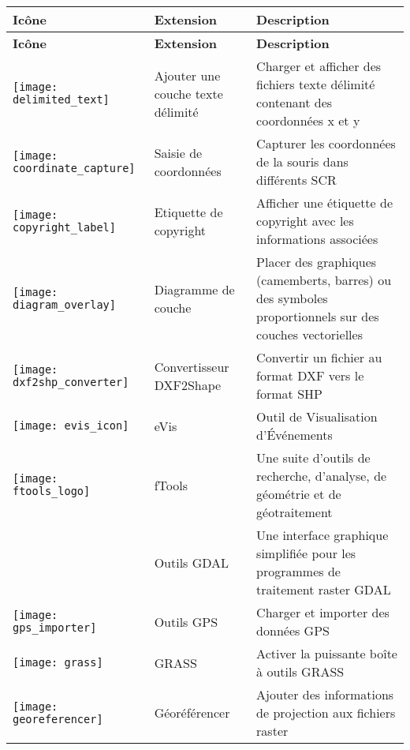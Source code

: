 {\setlength{\extrarowheight}{15pt}
\small
\begin{longtable}{|p{1cm}|p{4cm}|p{8cm}|}
\hline \textbf{Icône} & \textbf{Extension} & \textbf{Description} \\
\endfirsthead
\hline \textbf{Icône} & \textbf{Extension} & \textbf{Description} \\
\endhead
\hline 
\texttt{[image: delimited\_text]}
 & Ajouter une couche texte délimité \index{extensions!texte delimite} & Charger et afficher des fichiers texte délimité contenant des coordonnées x et y\\
\hline
\texttt{[image: coordinate\_capture]}
 & Saisie de coordonnées \index{extensions!saisie de coordonnees} & Capturer les coordonnées de la souris dans différents SCR\\
\hline 
\texttt{[image: copyright\_label]}
 & Etiquette de copyright \index{extensions!copyright} & Afficher une étiquette de copyright avec les informations associées\\
\hline
\texttt{[image: diagram\_overlay]}
 & Diagramme de couche \index{extensions!diagram} & Placer des graphiques (camemberts, barres) ou des symboles proportionnels sur des couches vectorielles\\
\hline
\texttt{[image: dxf2shp\_converter]}
 & Convertisseur DXF2Shape \index{extensions!DXF2Shape} & Convertir un fichier au format DXF vers le format SHP\\
\hline
\texttt{[image: evis\_icon]}
 & eVis & Outil de Visualisation d'Événements\\
\hline
\texttt{[image: ftools\_logo]}
 & fTools \index{extensions!ftools} & Une suite d'outils de recherche, d'analyse, de géométrie et de géotraitement\\
\hline
 & Outils GDAL \index{extensions!gdaltools} & Une interface graphique simplifiée pour les programmes de traitement raster GDAL\\
\hline
\texttt{[image: gps\_importer]}
 & Outils GPS \index{extensions!gps} & Charger et importer des données GPS\\
\hline
\texttt{[image: grass]}
 & GRASS \index{extensions!\grass!boîte à outils} & Activer la puissante boîte à outils GRASS\\
\hline
\texttt{[image: georeferencer]}
 & Géoréférencer \index{extensions!géoréférencement} & Ajouter des informations de projection aux fichiers raster\\

\end{longtable}}
